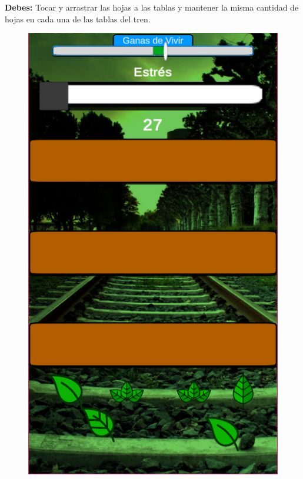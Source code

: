 \textbf{Debes:} Tocar y arrastrar las hojas a las tablas y mantener la misma cantidad de hojas en cada una de las tablas del tren.

\begin{figure}[h]
    \centering
    \begin{minipage}{0.45\textwidth}
        \includegraphics[scale=.5]{imgs/screenshot11.png}
    \end{minipage}
    \begin{minipage}{0.45\textwidth}
        \begin{flushright}

\end{flushright}
\end{minipage}
\end{figure}
